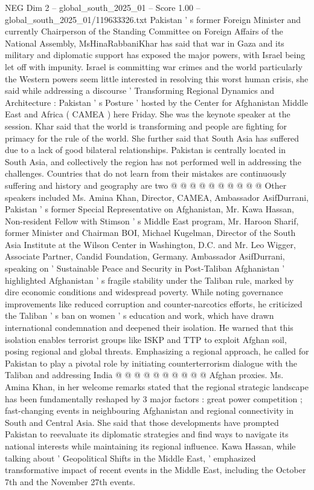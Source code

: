 \begin{textsample}{NEG Dim 2 – global\_south\_2025\_01 – Score 1.00 – global\_south\_2025\_01/119633326.txt}  \label{ex:f2_neg_131}
Pakistan ' s former Foreign Minister and currently Chairperson of the Standing Committee on Foreign Affairs of the National Assembly, MsHinaRabbaniKhar has said that war in Gaza and its military and diplomatic support has exposed the major powers, with Israel being let off with impunity.
Israel is committing war crimes and the world particularly the Western powers seem little interested in resolving this worst human crisis, she said while addressing a discourse ' Transforming Regional Dynamics and Architecture : Pakistan ' s Posture ' hosted by the Center for Afghanistan Middle East and Africa ( CAMEA ) here Friday.
She was the keynote speaker at the session.
Khar said that the world is transforming and people are fighting for primacy for the rule of the world.
She further said that South Asia has suffered due to a lack of good bilateral relationships.
Pakistan is centrally located in South Asia, and collectively the region has not performed well in addressing the challenges.
Countries that do not learn from their mistakes are continuously suffering and history and geography are two @ @ @ @ @ @ @ @ @ @ Other speakers included Ms.
Amina Khan, Director, CAMEA, Ambassador AsifDurrani, Pakistan ' s former Special Representative on Afghanistan, Mr.
Kawa Hassan, Non-resident Fellow with Stimson ' s Middle East program, Mr.
Haroon Sharif, former Minister and Chairman BOI, Michael Kugelman, Director of the South Asia Institute at the Wilson Center in Washington, D.C. and Mr.
Leo Wigger, Associate Partner, Candid Foundation, Germany.
Ambassador AsifDurrani, speaking on ' Sustainable Peace and Security in Post-Taliban Afghanistan ' highlighted Afghanistan ' s fragile stability under the Taliban rule, marked by dire economic conditions and widespread poverty.
While noting governance improvements like reduced corruption and counter-narcotics efforts, he criticized the Taliban ' s ban on women ' s education and work, which have drawn international condemnation and deepened their isolation.
He warned that this isolation enables terrorist groups like ISKP and TTP to exploit Afghan soil, posing regional and global threats.
Emphasizing a regional approach, he called for Pakistan to play a pivotal role by initiating counterterrorism dialogue with the Taliban and addressing India @ @ @ @ @ @ @ @ @ @ Afghan proxies.
Ms.
Amina Khan, in her welcome remarks stated that the regional strategic landscape has been fundamentally reshaped by 3 major factors : great power competition ; fast-changing events in neighbouring Afghanistan and regional connectivity in South and Central Asia.
She said that those developments have prompted Pakistan to reevaluate its diplomatic strategies and find ways to navigate its national interests while maintaining its regional influence.
Kawa Hassan, while talking about ' Geopolitical Shifts in the Middle East, ' emphasized transformative impact of recent events in the Middle East, including the October 7th and the November 27th events.

\end{textsample}
